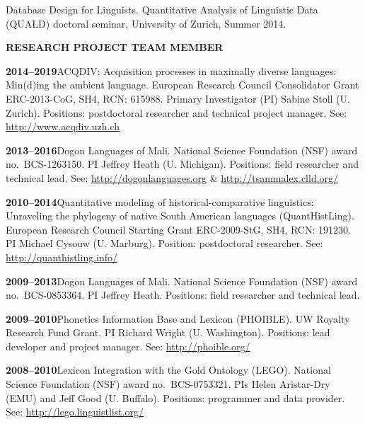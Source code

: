 \documentclass[11pt]{article}
\newcommand{\hangpara}{
 \setlength{\parindent}{0in} %
 \hangindent=0.42in %
}
\begin{document}
\vskip 6pt
\hangpara Database Design for Linguists. Quantitative Analysis of Linguistic Data (QUALD) doctoral seminar, University of Zurich, Summer 2014.

\vskip 20pt
\begin{flushleft}
{\bf RESEARCH PROJECT TEAM MEMBER}
\end{flushleft}


\hangpara
{\bf 2014--2019}\hspace{1ex}ACQDIV: Acquisition processes in maximally diverse languages: Min(d)ing the ambient language. European Research Council Consolidator Grant ERC-2013-CoG, SH4, RCN: 615988. Primary Investigator (PI) Sabine Stoll (U. Zurich). Positions: postdoctoral researcher and technical project manager. See: \url{http://www.acqdiv.uzh.ch}

\vskip 6pt
\hangpara
{\bf 2013--2016}\hspace{1ex}Dogon Languages of Mali. National Science Foundation (NSF) award no.\ BCS-1263150. PI Jeffrey Heath (U. Michigan). Positions: field researcher and technical lead. See: \url{http://dogonlanguages.org} \& \url{http://tsammalex.clld.org/}

\vskip 6pt
\hangpara
{\bf 2010--2014}\hspace{1ex}Quantitative modeling of historical-comparative linguistics: Unraveling the phylogeny of native South American languages (QuantHistLing). European Research Council Starting Grant ERC-2009-StG, SH4, RCN: 191230. PI Michael Cysouw (U. Marburg). Position: postdoctoral researcher. See: \url{http://quanthistling.info/}

\vskip 6pt
\hangpara
{\bf 2009--2013}\hspace{1ex}Dogon Languages of Mali. National Science Foundation (NSF) award no.\ BCS-0853364. PI Jeffrey Heath. Positions: field researcher and technical lead.

\vskip 6pt
\hangpara
{\bf 2009--2010}\hspace{1ex}Phonetics Information Base and Lexicon (PHOIBLE). UW Royalty Research Fund Grant. PI Richard Wright (U. Washington). Positions: lead developer and project manager. See: \url{http://phoible.org/}

\vskip 6pt
\hangpara
{\bf 2008--2010}\hspace{1ex}Lexicon Integration with the Gold Ontology (LEGO). National Science Foundation (NSF) award no.\ BCS-0753321. PIs Helen Aristar-Dry (EMU) and Jeff Good (U. Buffalo). Positions: programmer and data provider. See: \url{http://lego.linguistlist.org/}
\end{document}
